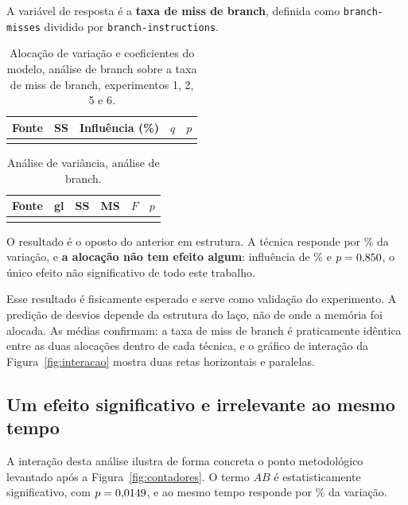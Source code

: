 \documentclass[11pt,a4paper]{article}
\begin{document}
A variável de resposta é a \textbf{taxa de miss de branch}, definida como
\texttt{branch-misses} dividido por \texttt{branch-instructions}.

\begin{table}[H]
\centering
\caption{Alocação de variação e coeficientes do modelo, análise de branch sobre a taxa de
miss de branch, experimentos 1, 2, 5 e 6.}
\label{tab:fat2}
\small
\begin{tabular}{@{}lrrrr@{}}
\toprule
\textbf{Fonte} & \textbf{SS} & \textbf{Influência (\%)} & \textbf{$q$} & \textbf{$p$} \\
\midrule
\\
\bottomrule
\end{tabular}
\end{table}

\begin{table}[H]
\centering
\caption{Análise de variância, análise de branch.}
\label{tab:anova2}
\small
\begin{tabular}{@{}lrrrrr@{}}
\toprule
\textbf{Fonte} & \textbf{gl} & \textbf{SS} & \textbf{MS} & \textbf{$F$} & \textbf{$p$} \\
\midrule
\\
\bottomrule
\end{tabular}
\end{table}

O resultado é o oposto do anterior em estrutura. A técnica responde por
\valFatDoisPctBP\% da variação, e \textbf{a alocação não tem efeito algum}: influência de
\valFatDoisPctAP\% e $p = 0{,}850$, o único efeito não significativo de todo
este trabalho.

Esse resultado é fisicamente esperado e serve como validação do experimento. A predição de
desvios depende da estrutura do laço, não de onde a memória foi alocada. As médias
confirmam: a taxa de miss de branch é praticamente idêntica entre as duas alocações dentro
de cada técnica, e o gráfico de interação da Figura~\ref{fig:interacao} mostra duas retas
horizontais e paralelas.

\subsection{Um efeito significativo e irrelevante ao mesmo tempo}

A interação desta análise ilustra de forma concreta o ponto metodológico levantado após a
Figura~\ref{fig:contadores}. O termo $AB$ é estatisticamente significativo, com
$p = 0{,}0149$, e ao mesmo tempo responde por \valFatDoisPctABP\% da variação.
\end{document}
